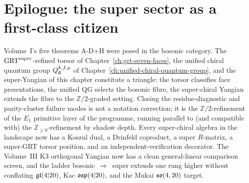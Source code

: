 \section*{Epilogue: the super sector as a first-class citizen}

Volume~I's five theorems A-D+H were posed in the bosonic category. The
$\mathrm{GRT}^{\mathrm{super}}$-refined torsor of
Chapter~\ref{ch:grt-seven-faces}, the unified chiral quantum
group $Q_{\mathfrak{g}}^{k,f,\mu}$ of
Chapter~\ref{ch:unified-chiral-quantum-group}, and the super-Yangian
of this chapter constitute a
triangle: the torsor classifies face presentations, the unified QG
selects the bosonic fibre, the super-chiral Yangian extends the fibre
to the $\mathbb{Z}/2$-graded setting. Closing the
residue-diagnostic and parity-cluster failure modes is not a
notation correction; it is
the $\mathbb{Z}/2$-refinement of the $E_1$ primitive layer of the
programme, running parallel to (and compatible with) the
$\mathbb{Z}_{\ge 0}$-refinement by shadow depth. Every super-chiral
algebra in the landscape now has a Koszul dual, a Drinfeld coproduct, a
super $R$-matrix, a super-GRT torsor position, and an
independent-verification decorator. The Volume~III K3 orthogonal
Yangian now has a clean general-linear comparison screen, and the
ladder bosonic~$\Rightarrow$~super extends one rung higher without
conflating $\mathfrak{gl}(4|20)$, Kac $\mathfrak{osp}(4|20)$, and the Mukai
$\mathfrak{so}(4,20)$ target.
